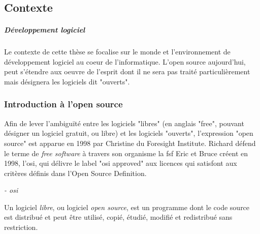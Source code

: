 \chapter{\color{burntorange}{Introduction}}

	\section{Contexte}

		\paragraph{Développement logiciel \\}
		
			Le contexte de cette thèse se focalise sur le monde et l'environnement de développement logiciel au coeur de l'informatique. L'\Gls{open source} aujourd'hui, peut s'étendre aux oeuvre de l'esprit dont il ne sera pas traité particulièrement mais désignera les logiciels dit "ouverts".
		
		\subsection{Introduction à l'open source}

			Afin de lever l'ambiguïté entre les logiciels "libres" (en anglais "free", pouvant désigner un logiciel gratuit, ou libre) et les logiciels "ouverts", l'expression "\gls{open source}" est apparue en 1998 par Christine  du Foresight Institute.
			Richard  défend le terme de \textit{free software} à travers son organisme la \acrfull{fsf}
			Eric  et Bruce  créent en 1998, l'\acrfull{osi}, qui délivre le label "\acrshort{osi} approved" aux licences qui satisfont aux critères définis dans l'Open Source Definition.

			\begin{center}
				\textit{
				 - \acrshort{osi}
				}
			\end{center}

			Un logiciel \textit{libre}, ou logiciel \textit{open source}, est un programme dont le code source est distribué et peut être utilisé, copié, étudié, modifié et redistribué sans restriction.

